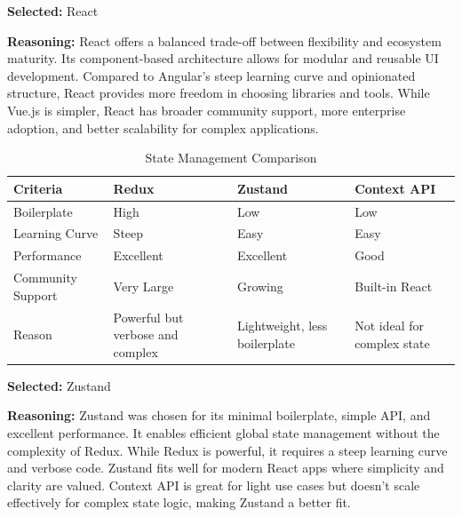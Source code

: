 \textbf{Selected:} React \par
\textbf{Reasoning:} React offers a balanced trade-off between flexibility and ecosystem maturity. Its component-based architecture allows for modular and reusable UI development. Compared to Angular’s steep learning curve and opinionated structure, React provides more freedom in choosing libraries and tools. While Vue.js is simpler, React has broader community support, more enterprise adoption, and better scalability for complex applications.

\vspace{2em}

\begin{table}[H]
\centering
\caption{State Management Comparison}
\begin{tabular}{|l|p{4cm}|p{4cm}|p{4cm}|}
\hline
\textbf{Criteria}       & \textbf{Redux}              & \textbf{Zustand}              & \textbf{Context API}          \\
\hline
Boilerplate             & High                        & Low                          & Low                          \\
Learning Curve          & Steep                       & Easy                         & Easy                         \\
Performance             & Excellent                   & Excellent                    & Good                         \\
Community Support       & Very Large                  & Growing                      & Built-in React               \\
Reason                  & Powerful but verbose and complex & Lightweight, less boilerplate & Not ideal for complex state \\
\hline
\end{tabular}
\label{tab:state-management-comparison}
\end{table}

\textbf{Selected:} Zustand \par
\textbf{Reasoning:} Zustand was chosen for its minimal boilerplate, simple API, and excellent performance. It enables efficient global state management without the complexity of Redux. While Redux is powerful, it requires a steep learning curve and verbose code. Zustand fits well for modern React apps where simplicity and clarity are valued. Context API is great for light use cases but doesn’t scale effectively for complex state logic, making Zustand a better fit.

\vspace{2em}

